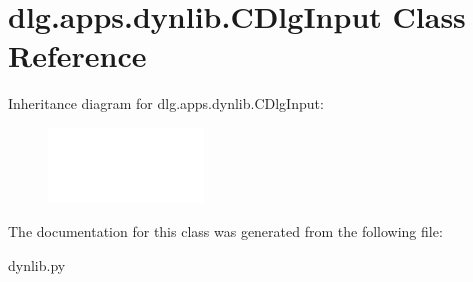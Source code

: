 \hypertarget{classdlg_1_1apps_1_1dynlib_1_1_c_dlg_input}{}\section{dlg.\+apps.\+dynlib.\+C\+Dlg\+Input Class Reference}
\label{classdlg_1_1apps_1_1dynlib_1_1_c_dlg_input}
Inheritance diagram for dlg.\+apps.\+dynlib.\+C\+Dlg\+Input\+:\begin{figure}[H]
\begin{center}
\leavevmode
\includegraphics[height=2.000000cm]{classdlg_1_1apps_1_1dynlib_1_1_c_dlg_input}
\end{center}
\end{figure}


The documentation for this class was generated from the following file\+:\begin{DoxyCompactItemize}
\item 
dynlib.\+py\end{DoxyCompactItemize}
